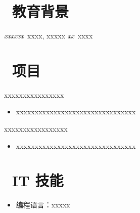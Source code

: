 \documentclass{style/resume_web}
\begin{document}
    
    
     
    \section{\faGraduationCap\  教育背景}
    \textit{xxxxxx}\ xxxx, xxxxx 
    \textit{xx}\ xxxx 
    
    \bigbreak
    
    \section{\faHistory\ 项目}
    
    \begin{onehalfspacing}
    xxxxxxxxxxxxxxxx
    \begin{itemize}
      \item xxxxxxxxxxxxxxxxxxxxxxxxxxxxxxxx
    \end{itemize}
    \end{onehalfspacing}
    
    \begin{onehalfspacing}
    xxxxxxxxxxxxxxxxx
    \begin{itemize}
      \item xxxxxxxxxxxxxxxxxxxxxxxxxxxxxxxx
    \end{itemize}
    \end{onehalfspacing}
    

    \section{\faCogs\ IT 技能}
    \begin{itemize}[parsep=0.5ex]
      \item 编程语言：xxxxx
    \end{itemize}
    
\end{document}
